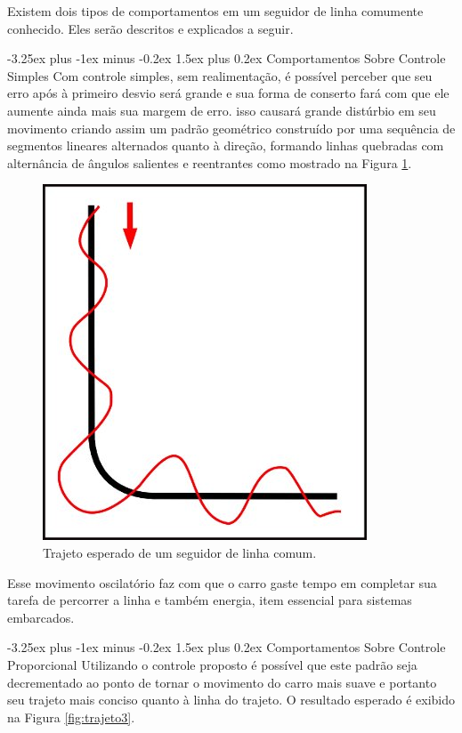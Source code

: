 \documentclass[portugues, brazil, a4paper,12pt]{article}
\makeatletter
\renewcommand{\paragraph}{\@startsection{paragraph}{4}{0ex}%
   {-3.25ex plus -1ex minus -0.2ex}%
   {1.5ex plus 0.2ex}%
   {\normalfont\normalsize\bfseries}}
\makeatother
\begin{document}
			Existem dois tipos de comportamentos em um seguidor de linha comumente conhecido. Eles serão descritos e explicados a seguir.

			\paragraph{Comportamentos Sobre Controle Simples}
				Com controle simples, sem realimentação, é possível perceber que seu erro após à primeiro desvio será grande e sua forma de conserto fará com que ele aumente ainda mais sua margem de erro. isso causará grande distúrbio em seu movimento criando assim um padrão geométrico construído por uma sequência de segmentos lineares alternados quanto à direção, formando linhas quebradas com alternância de ângulos salientes e reentrantes como mostrado na Figura \ref{fig:trajeto2}.

				\begin{figure}[H]
					\centering
					\includegraphics[width=0.5\linewidth]{img/elementos-trajeto2.jpg}
					\caption{Trajeto esperado de um seguidor de linha comum.}
					\label{fig:trajeto2}
				\end{figure}

				Esse movimento oscilatório faz com que o carro gaste tempo em completar sua tarefa de percorrer a linha e também energia, item essencial para sistemas embarcados.

			\paragraph{Comportamentos Sobre Controle Proporcional}
				Utilizando o controle proposto é possível que este padrão seja decrementado ao ponto de tornar o movimento do carro mais suave e portanto seu trajeto mais conciso quanto à linha do trajeto. O resultado esperado é exibido na Figura \ref{fig:trajeto3}.
\end{document}
